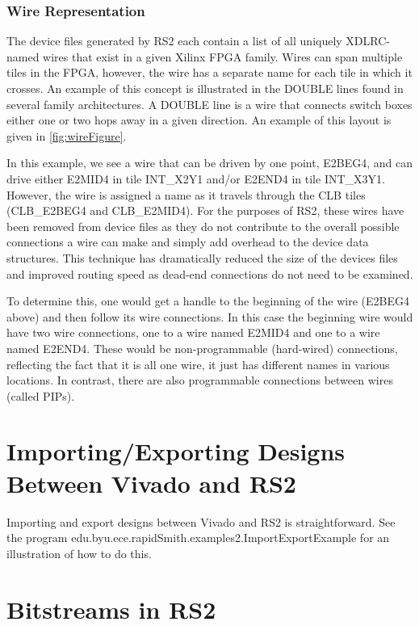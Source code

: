 \documentclass[12pt]{article}
\begin{document}
\subsubsection{Wire Representation}
The device files generated by RS2 each contain a list of all uniquely
XDLRC-named wires that exist in a given Xilinx FPGA family.  Wires can span
multiple tiles in the FPGA, however, the wire has a separate name for each tile
in which it crosses.  An example of this concept is illustrated in the DOUBLE
lines found in several family architectures.  A DOUBLE line is a wire that
connects switch boxes either one or two hops away in a given direction.  An
example of this layout is given in \autoref{fig:wireFigure}.

In this example, we see a wire that can be driven by one point, E2BEG4, and can
drive either E2MID4 in tile INT\_X2Y1 and/or E2END4 in tile INT\_X3Y1.  However,
the wire is assigned a name as it travels through the CLB tiles (CLB\_E2BEG4 and
CLB\_E2MID4).  For the purposes of RS2, these wires have been removed from
device files as they do not contribute to the overall possible connections a wire can
make and simply add overhead to the device data structures.  This technique has
dramatically reduced the size of the devices files and improved routing speed as
dead-end connections do not need to be examined.

To determine this, one would get a handle to the beginning of the wire (E2BEG4
above) and then follow its wire connections.  In this case the beginning wire
would have two wire connections, one to a wire named E2MID4 and one to a wire
named E2END4.  These would be non-programmable (hard-wired) connections,
reflecting the fact that it is all one wire, it just has different names in
various locations.  In contrast, there are also programmable connections between
wires (called PIPs).

\section{Importing/Exporting Designs Between Vivado and RS2}

Importing and export designs between Vivado and RS2 is straightforward.  See the
program edu.byu.ece.rapidSmith.examples2.ImportExportExample for an illustration
of how to do this.

\section{Bitstreams in RS2}
\end{document}
